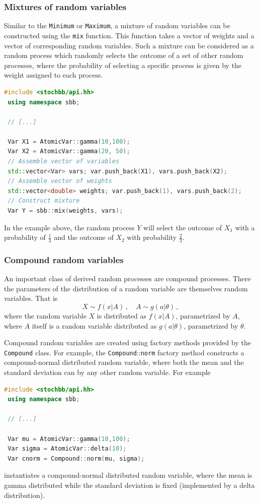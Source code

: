 \documentclass[a4paper, 10pt]{paper}
\newcommand{\code}[1]{\texttt{#1}}
\newcommand{\class}[1]{\code{#1}}
\newcommand{\method}[2]{\code{#1}::\code{#2}}
\newcommand{\function}[1]{\code{#1}}
\begin{document}
\subsubsection{Mixtures of random variables}
Similar to the \class{Minimum} or \class{Maximum}, a mixture of random variables can be
constructed using the \function{mix} function. This function takes a vector of weights and a vector
of corresponding random variables. Such a mixture can be considered as a random process which
randomly selects the outcome of a set of other random processes, where the probability of
selecting a specific process is given by the weight assigned to each process.
\begin{lstlisting}[language=C++]
 #include <stochbb/api.hh>
 using namespace sbb;

 // [...]

 Var X1 = AtomicVar::gamma(10,100);
 Var X2 = AtomicVar::gamma(20, 50);
 // Assemble vector of variables
 std::vector<Var> vars; var.push_back(X1), vars.push_back(X2);
 // Assemble vector of weights
 std::vector<double> weights; var.push_back(1), vars.push_back(2);
 // Construct mixture
 Var Y = sbb::mix(weights, vars);
\end{lstlisting}

In the example above, the random process $Y$ will select the outcome of $X_1$ with
a probability of $\frac{1}{3}$ and the outcome of $X_2$ with probability
$\frac{2}{3}$.

\subsubsection{Compound random variables}
An important class of derived random processes are compound processes. There the parameters of the
distribution of a random variable are themselves random variables. That is
\begin{equation}
 X \sim f(x|A)\,,\quad A \sim g(a|\theta)\,, \nonumber
\end{equation}
where the random variable $X$ is distributed as $f(x|A)$, parametrized by $A$,
where $A$ itself is a random variable distributed as $g(a|\theta)$, parametrized by
$\theta$. 

Compound random variables are created using factory methods provided by the
\class{Compound} class. For example, the \method{Compound}{norm} factory method constructs
a compound-normal distributed random variable, where both the mean and the standard deviation
can by any other random variable. For example
\begin{lstlisting}[language=C++]
 #include <stochbb/api.hh>
 using namespace sbb;
 
 // [...]
 
 Var mu = AtomicVar::gamma(10,100);
 Var sigma = AtomicVar::delta(10);
 Var cnorm = Compound::norm(mu, sigma);
\end{lstlisting}
instantiates a compound-normal distributed random variable, where the mean is gamma distributed
while the standard deviation is fixed (implemented by a delta distribution).
\end{document}
